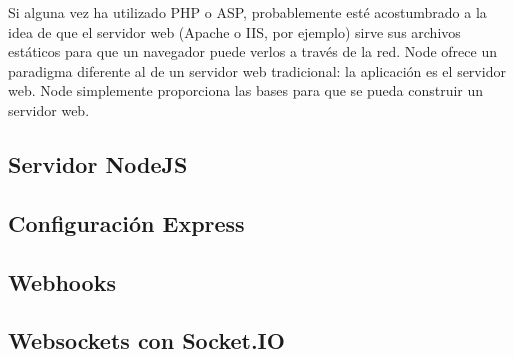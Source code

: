 Si alguna vez ha utilizado PHP o ASP, probablemente esté acostumbrado a la idea de que el servidor web (Apache o IIS, por ejemplo) sirve sus archivos estáticos para que un navegador puede verlos a través de la red. Node ofrece un paradigma diferente al de un servidor web tradicional: la aplicación es el servidor web. Node simplemente proporciona las bases para que se pueda construir un servidor web. 

\subsection{Servidor NodeJS}


\subsection{Configuración Express}


\subsection{Webhooks}


\subsection{Websockets con Socket.IO}
